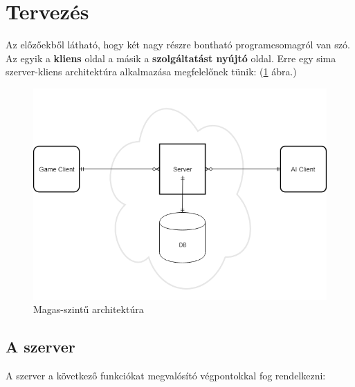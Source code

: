 \documentclass[twoside, a4paper, 12pt]{article}
\begin{document}
\newpage
\section{Tervezés}
Az előzőekből látható, hogy két nagy részre bontható programcsomagról van szó. Az egyik a \textbf{kliens} oldal a másik a \textbf{szolgáltatást nyújtó} oldal. Erre egy sima szerver-kliens architektúra alkalmazása megfelelőnek tünik: (\ref{fig:highLevelArchitecture} ábra.)

\begin{figure}[htbp]
	\centering
	\includegraphics[width=1.0\textwidth]{img/highLevelArchitecture.png}
	\caption{Magas-szintű architektúra}
	\label{fig:highLevelArchitecture}
\end{figure}

\subsection{A szerver}

A szerver a következő funkciókat megvalósító végpontokkal fog rendelkezni:
\end{document}
